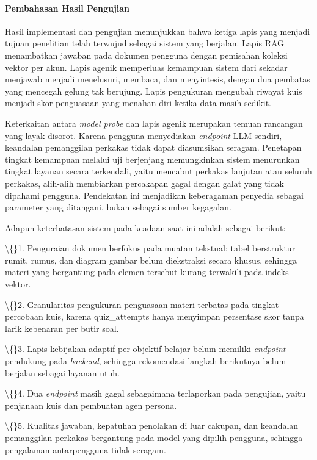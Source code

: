 \documentclass[12pt,a4paper]{article}
\begin{document}
\paragraph*{Pembahasan Hasil Pengujian}
Hasil implementasi dan pengujian menunjukkan bahwa ketiga lapis yang menjadi tujuan penelitian telah terwujud sebagai sistem yang berjalan. Lapis RAG menambatkan jawaban pada dokumen pengguna dengan pemisahan koleksi vektor per akun. Lapis agenik memperluas kemampuan sistem dari sekadar menjawab menjadi menelusuri, membaca, dan menyintesis, dengan dua pembatas yang mencegah gelung tak berujung. Lapis pengukuran mengubah riwayat kuis menjadi skor penguasaan yang menahan diri ketika data masih sedikit.

Keterkaitan antara \textit{model probe} dan lapis agenik merupakan temuan rancangan yang layak disorot. Karena pengguna menyediakan \textit{endpoint} LLM sendiri, keandalan pemanggilan perkakas tidak dapat diasumsikan seragam. Penetapan tingkat kemampuan melalui uji berjenjang memungkinkan sistem menurunkan tingkat layanan secara terkendali, yaitu mencabut perkakas lanjutan atau seluruh perkakas, alih-alih membiarkan percakapan gagal dengan galat yang tidak dipahami pengguna. Pendekatan ini menjadikan keberagaman penyedia sebagai parameter yang ditangani, bukan sebagai sumber kegagalan.

Adapun keterbatasan sistem pada keadaan saat ini adalah sebagai berikut:

\textbackslash\{\}1. Penguraian dokumen berfokus pada muatan tekstual; tabel berstruktur rumit, rumus, dan diagram gambar belum diekstraksi secara khusus, sehingga materi yang bergantung pada elemen tersebut kurang terwakili pada indeks vektor.

\textbackslash\{\}2. Granularitas pengukuran penguasaan materi terbatas pada tingkat percobaan kuis, karena quiz\_attempts hanya menyimpan persentase skor tanpa larik kebenaran per butir soal.

\textbackslash\{\}3. Lapis kebijakan adaptif per objektif belajar belum memiliki \textit{endpoint} pendukung pada \textit{backend}, sehingga rekomendasi langkah berikutnya belum berjalan sebagai layanan utuh.

\textbackslash\{\}4. Dua \textit{endpoint} masih gagal sebagaimana terlaporkan pada pengujian, yaitu penjanaan kuis dan pembuatan agen persona.

\textbackslash\{\}5. Kualitas jawaban, kepatuhan penolakan di luar cakupan, dan keandalan pemanggilan perkakas bergantung pada model yang dipilih pengguna, sehingga pengalaman antarpengguna tidak seragam.
\end{document}
